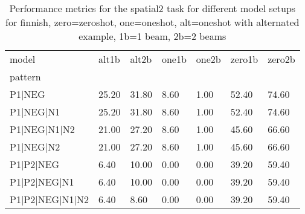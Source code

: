 \begin{table}[h]
\begin{tabular}{l|llllll}
\toprule
model & alt1b & alt2b & one1b & one2b & zero1b & zero2b \\
pattern &  &  &  &  &  &  \\
\midrule
P1|NEG & 25.20 & 31.80 & 8.60 & 1.00 & 52.40 & 74.60 \\
P1|NEG|N1 & 25.20 & 31.80 & 8.60 & 1.00 & 52.40 & 74.60 \\
P1|NEG|N1|N2 & 21.00 & 27.20 & 8.60 & 1.00 & 45.60 & 66.60 \\
P1|NEG|N2 & 21.00 & 27.20 & 8.60 & 1.00 & 45.60 & 66.60 \\
P1|P2|NEG & 6.40 & 10.00 & 0.00 & 0.00 & 39.20 & 59.40 \\
P1|P2|NEG|N1 & 6.40 & 10.00 & 0.00 & 0.00 & 39.20 & 59.40 \\
P1|P2|NEG|N1|N2 & 6.40 & 8.60 & 0.00 & 0.00 & 39.20 & 59.40 \\
\bottomrule
\end{tabular}
\caption{Performance metrics for the spatial2 task for different model setups for finnish, zero=zeroshot, one=oneshot, alt=oneshot with alternated example, 1b=1 beam, 2b=2 beams}
\label{tab:fi_spatial2_performance}
\end{table}
